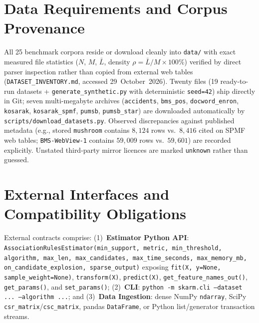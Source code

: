 \section{Data Requirements and Corpus Provenance}
All 25 benchmark corpora reside or download cleanly into \texttt{data/\protect\allowbreak{}} with exact measured file statistics ($N$, $M$, $\bar{L}$, density $\rho = \bar{L}/M \times 100\%$) verified by direct parser inspection rather than copied from external web tables (\texttt{DATASET\_\protect\allowbreak{}INVENTORY.md}, accessed 29~October~2026). Twenty files (19 ready-to-run datasets + \texttt{generate\_\protect\allowbreak{}synthetic.py} with deterministic \texttt{seed=42}) ship directly in Git; seven multi-megabyte archives (\texttt{accidents}, \texttt{bms\_\protect\allowbreak{}pos}, \texttt{docword\_\protect\allowbreak{}enron}, \texttt{kosarak}, \texttt{kosarak\_\protect\allowbreak{}spmf}, \texttt{pumsb}, \texttt{pumsb\_\protect\allowbreak{}star}) are downloaded automatically by \texttt{scripts/download\_\protect\allowbreak{}datasets.py}. Observed discrepancies against published metadata (e.g., stored \texttt{mushroom} contains $8{,}124$ rows vs.\ $8{,}416$ cited on SPMF web tables; \texttt{BMS-WebView-1} contains $59{,}009$ rows vs.\ $59{,}601$) are recorded explicitly. Unstated third-party mirror licences are marked \texttt{unknown} rather than guessed.

\section{External Interfaces and Compatibility Obligations}
External contracts comprise: (1)~\textbf{Estimator Python API}: \texttt{Association\protect\allowbreak{}Rules\protect\allowbreak{}Estimator(min\_\protect\allowbreak{}support, metric, min\_\protect\allowbreak{}threshold, algorithm, max\_\protect\allowbreak{}len, max\_\protect\allowbreak{}candidates, max\_\protect\allowbreak{}time\_\protect\allowbreak{}seconds, max\_\protect\allowbreak{}memory\_\protect\allowbreak{}mb, on\_\protect\allowbreak{}candidate\_\protect\allowbreak{}explosion, sparse\_\protect\allowbreak{}output)} exposing \texttt{fit(X, y=None, sample\_\protect\allowbreak{}weight=None)}, \texttt{transform(X)}, \texttt{predict(X)}, \texttt{get\_\protect\allowbreak{}feature\_\protect\allowbreak{}names\_\protect\allowbreak{}out()}, \texttt{get\_\protect\allowbreak{}params()}, and \texttt{set\_\protect\allowbreak{}params()}; (2)~\textbf{CLI}: \texttt{python -m skarm.cli --dataset ... --algorithm ...}; and (3)~\textbf{Data Ingestion}: dense NumPy \texttt{ndarray}, SciPy \texttt{csr\_\protect\allowbreak{}matrix}/\texttt{csc\_\protect\allowbreak{}matrix}, pandas \texttt{DataFrame}, or Python list/generator transaction streams.

